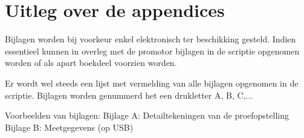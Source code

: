 \chapter{Uitleg over de appendices}
Bijlagen worden bij voorkeur enkel elektronisch ter beschikking gesteld. Indien essentieel kunnen in overleg met de promotor bijlagen in de scriptie opgenomen worden of als apart boekdeel voorzien worden.

Er wordt wel steeds een lijst met vermelding van alle bijlagen opgenomen in de scriptie. Bijlagen worden genummerd het een drukletter A, B, C,...

Voorbeelden van bijlagen:
Bijlage A: \qquad	Detailtekeningen van de proefopstelling
Bijlage B: \qquad	Meetgegevens (op USB)
